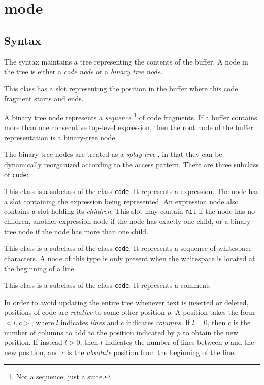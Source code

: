\chapter{\commonlisp{} mode}
\label{chap-internals-common-lisp-mode}

\section{Syntax}

The \commonlisp{} syntax maintains a tree representing the contents of
the buffer.  A node in the tree is either a \emph{code node} or
a \emph{binary tree node}.


This class has a slot representing the position in the buffer where
this code fragment starts and ends.


A binary tree node represents a \emph{sequence}%
\footnote{Not a \commonlisp{} sequence; just a suite.}  of code
fragments.  If a buffer contains more than one consecutive top-level
expression, then the root node of the buffer representation is a
binary-tree node.

The binary-tree nodes are treated as a \emph{splay tree}
\cite{Sleator:1985:SBS:3828.3835}, in that they can be dynamically
reorganized according to the access pattern.
There are three subclass of \texttt{code}:


This class is a subclass of the class \texttt{code}.  It represents a
\commonlisp{} expression.  The node has a slot containing the
expression being represented.  An expression node also
contains a slot holding its \emph{children}.  This slot may contain
\texttt{nil} if the node has no children, another expression node if
the node has exactly one child, or a binary-tree node if the node has
more than one child.


This class is a subclass of the class \texttt{code}.  It represents a
sequence of whitespace characters.  A node of this type is only
present when the whitespace is located at the beginning of a line.


This class is a subclass of the class \texttt{code}.  It represents a
\commonlisp{} comment.

In order to avoid updating the entire tree whenever text is inserted
or deleted, positions of code are \emph{relative} to some other
position $p$.  A position takes the form $<l,c>$, where $l$ indicates
\emph{lines} and $c$ indicates \emph{columns}.  If $l = 0$, then $c$
is the number of columns to add to the position indicated by $p$ to
obtain the new position.  If instead $l > 0$, then $l$ indicates the
number of lines between $p$ and the new position, and $c$ is the
\emph{absolute} position from the beginning of the line.

